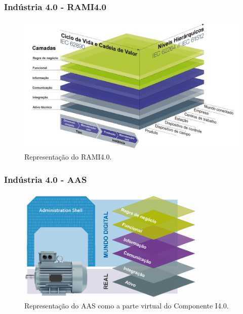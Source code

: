 \documentclass[10pt]{beamer}
\begin{document}
\begin{frame}
	
	\frametitle{Indústria 4.0 - RAMI4.0}
	
	\begin{figure}[htb]
		\centering
		\caption{Representação do RAMI4.0.}
		\label{fig:rami4}
		\includegraphics[width=1\textwidth]{rami4.png}
	\end{figure}
	
\end{frame}
\begin{frame}
	
	\frametitle{Indústria 4.0 - AAS} 
	
	\begin{figure}[htb]
		\centering
		\caption{Representação do AAS como a parte virtual do Componente I4.0.}
		\label{fig:aas-rami}
		\includegraphics[width=0.8\textwidth]{aas-rami.png}
	\end{figure}
	
\end{frame}
\end{document}

